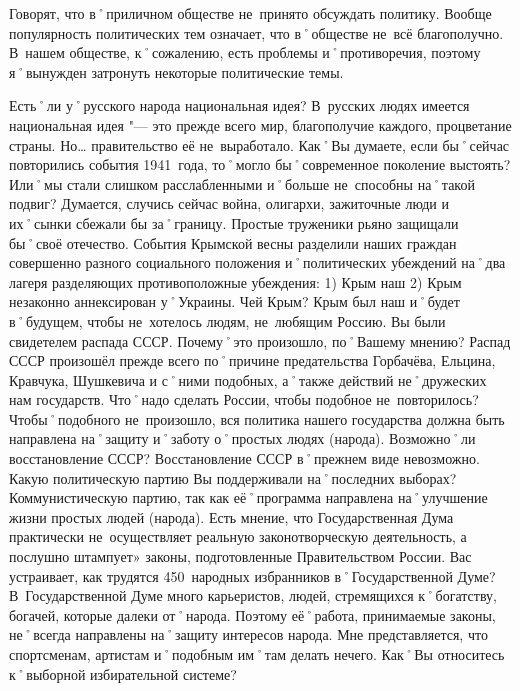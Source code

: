 \begin{drama}
	\maxspeaks Говорят, что в˚приличном обществе не~принято обсуждать политику. Вообще популярность политических тем означает, что в˚обществе не~всё благополучно. В~нашем обществе, к˚сожалению, есть проблемы и˚противоречия, поэтому я˚вынужден затронуть некоторые политические темы.
	
	Есть˚ли у˚русского народа национальная идея?
	\michaelspeaks В~русских людях имеется национальная идея "--- это прежде всего мир, благополучие каждого, процветание страны. Но… правительство её не~выработало.
	\maxspeaks Как˚Вы думаете, если бы˚сейчас повторились события 1941~года, то˚могло бы˚современное поколение выстоять? Или˚мы стали слишком расслабленными и˚больше не~способны на˚такой подвиг?
	\michaelspeaks Думается, случись сейчас война, олигархи, зажиточные люди и их˚сынки сбежали бы за˚границу. Простые труженики рьяно защищали бы˚своё отечество.
	\maxspeaks События Крымской весны разделили наших граждан совершенно разного социального положения и˚политических убеждений на˚два лагеря разделяющих противоположные убеждения: 1) Крым наш 2) Крым незаконно аннексирован у˚Украины. Чей Крым?
	\michaelspeaks Крым был наш и˚будет в˚будущем, чтобы не~хотелось людям, не~любящим Россию.
	\maxspeaks Вы были свидетелем распада СССР. Почему˚это произошло, по˚Вашему мнению? 
	\michaelspeaks Распад СССР произошёл прежде всего по˚причине предательства Горбачёва, Ельцина, Кравчука, Шушкевича и с˚ними подобных, а˚также действий не˚дружеских нам государств.	
	\maxspeaks Что˚надо сделать России, чтобы подобное не~повторилось? 
	\michaelspeaks Чтобы˚подобного не~произошло, вся политика нашего государства должна быть направлена на˚защиту и˚заботу о˚простых людях (народа).
	\maxspeaks Возможно˚ли восстановление СССР?
	\michaelspeaks Восстановление СССР в˚прежнем виде невозможно. 
	\maxspeaks Какую политическую партию Вы поддерживали на˚последних выборах? 
	\michaelspeaks Коммунистическую партию, так как её˚программа направлена на˚улучшение жизни простых людей (народа).
	\maxspeaks Есть мнение, что Государственная Дума практически не~осуществляет реальную законотворческую деятельность, а послушно штампует» законы, подготовленные Правительством России. Вас устраивает, как трудятся 450~народных избранников в˚Государственной Думе? 
	\michaelspeaks В~Государственной Думе много карьеристов, людей, стремящихся к˚богатству, богачей, которые далеки от˚народа. Поэтому её˚работа, принимаемые законы, не˚всегда направлены на˚защиту интересов народа. Мне представляется, что спортсменам, артистам и˚подобным им˚там делать нечего.
	\maxspeaks Как˚Вы относитесь к˚выборной избирательной системе? 

\end{drama}
